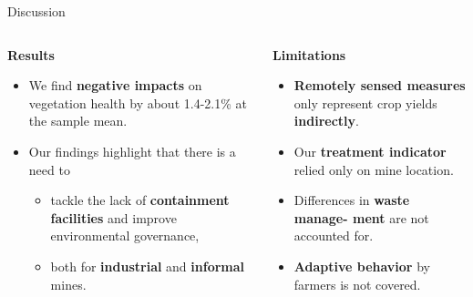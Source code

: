 \documentclass[aspectratio=169,11pt,dvipsnames, handout]{beamer}
\begin{document}
\begin{frame}{Discussion}
\vspace{-2.5em}
    \begin{columns}[t]
        \begin{column}{0.45\textwidth}
            \begin{tcolorbox}[colback=defaultclr!20, colframe=defaultclr!20, fontupper=\bfseries\color{defaultclr!40!black}, width=\textwidth, sharp corners, boxrule=0pt, halign=center]
                \textbf{Results}
            \end{tcolorbox}
            \vspace{-0.75em}
            \begin{itemize}
    \item We find \textbf{negative impacts} on vegetation health by about 1.4-2.1\% at the sample mean.
    \vspace{0.5em}
    \item Our findings highlight that there is a need to
    \begin{itemize}
        \item tackle the lack of \textbf{containment facilities} and improve environmental governance,
        \vspace{0.25em}
        \item both for \textbf{industrial} and \textbf{informal} mines.
    \end{itemize}
\end{itemize}
        \end{column}
        \begin{column}{0.45\textwidth}
            \begin{tcolorbox}[colback=secondclr!20, colframe=secondclr!20, fontupper=\bfseries\color{secondclr!40!black}, width=\textwidth, sharp corners, boxrule=0pt, halign=center]
                \textbf{Limitations}
            \end{tcolorbox}
            \vspace{-0.75em}
\begin{itemize}
    \item \textbf{Remotely sensed measures} only represent crop yields \textbf{indirectly}.
    \item Our \textbf{treatment indicator} relied only on mine location.
    \item Differences in \textbf{waste manage- ment} are not accounted for.
    \item \textbf{Adaptive behavior} by farmers is not covered.
\end{itemize}
        \end{column}
    \end{columns}
\end{frame}
\end{document}
